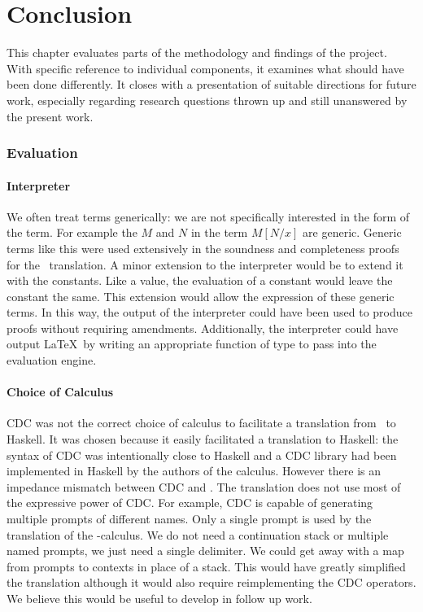 \chapter{Conclusion}

This chapter evaluates parts of the methodology and findings of the project.
With specific reference to individual components, it examines what should have been done differently.
It closes with a presentation of suitable directions for future work, 
especially regarding research questions thrown up and still unanswered by the present work.

\subsection{Evaluation}
\subsubsection{Interpreter}
We often treat terms generically: we are not specifically interested in the form of the term.
For example the $M$ and $N$ in the term $M[N/x]$ are generic.
Generic terms like this were used extensively in the soundness and completeness proofs for the \lmu\ translation.
A minor extension to the interpreter would be to extend it with the constants.
Like a value, the evaluation of a constant would leave the constant the same. 
This extension would allow the expression of these generic terms.
In this way, the output of the interpreter could have been used to produce proofs without requiring amendments.
Additionally, 
the interpreter could have output \LaTeX\ by writing an appropriate function of type  to pass into the evaluation engine.

\subsubsection{Choice of Calculus}
CDC was not the correct choice of calculus to facilitate a translation from \ltry\ to Haskell.  
It was chosen because it easily facilitated a translation to Haskell: 
the syntax of CDC was intentionally close to Haskell
and a CDC library had been implemented in Haskell by the authors of the calculus.
However there is an impedance mismatch between CDC and \lmu.
The translation does not use most of the expressive power of CDC.
For example, 
CDC is capable of generating multiple prompts of different names.
Only a single prompt is used by the translation of the \lmu-calculus. 
We do not need a continuation stack or multiple named prompts, we just need a single delimiter.
We could get away with a map from prompts to contexts in place of a stack.
This would have greatly simplified the translation although it would also require reimplementing the CDC operators.
We believe this would be useful to develop in follow up work.

